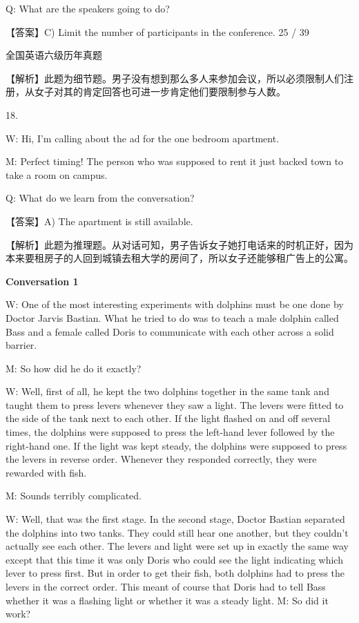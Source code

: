 \documentclass[UTF8,11pt]{ctexart}
\begin{document}
Q: What are the speakers going to do?


【答案】C) Limit the number of participants in the conference. 25 / 39


全国英语六级历年真题


【解析】此题为细节题。男子没有想到那么多人来参加会议，所以必须限制人们注册，从女子对其的肯定回答也可进一步肯定他们要限制参与人数。


18.


W: Hi, I’m calling about the ad for the one bedroom apartment.


M: Perfect timing! The person who was supposed to rent it just backed town to take a room on campus.


Q: What do we learn from the conversation?


【答案】A) The apartment is still available.


【解析】此题为推理题。从对话可知，男子告诉女子她打电话来的时机正好，因为本来要租房子的人回到城镇去租大学的房间了，所以女子还能够租广告上的公寓。


\textbf{Conversation 1}


W: One of the most interesting experiments with dolphins must be one done by Doctor Jarvis Bastian. What he tried to do was to teach a male dolphin called Bass and a female called Doris to communicate with each other across a solid barrier.


M: So how did he do it exactly?


W: Well, first of all, he kept the two dolphins together in the same tank and taught them to press levers whenever they saw a light. The levers were fitted to the side of the tank next to each other. If the light flashed on and off several times, the dolphins were supposed to press the left-hand lever followed by the right-hand one. If the light was kept steady, the dolphins were supposed to press the levers in reverse order. Whenever they responded correctly, they were rewarded with fish.


M: Sounds terribly complicated.


W: Well, that was the first stage. In the second stage, Doctor Bastian separated the dolphins into two tanks. They could still hear one another, but they couldn’t actually see each other. The levers and light were set up in exactly the same way except that this time it was only Doris who could see the light indicating which lever to press first. But in order to get their fish, both dolphins had to press the levers in the correct order. This meant of course that Doris had to tell Bass whether it was a flashing light or whether it was a steady light. M: So did it work?
\end{document}

